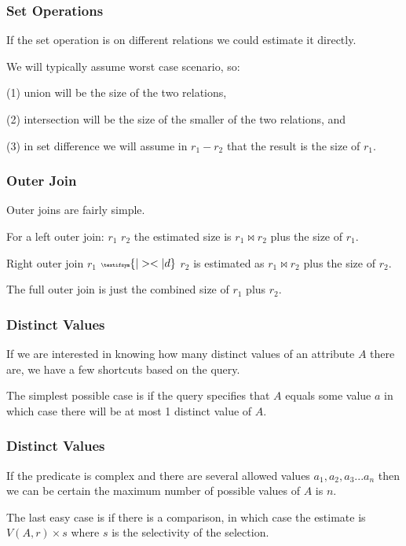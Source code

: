 \begin{frame}
\frametitle{Set Operations}

If the set operation is on different relations we could estimate it directly. 

We will typically assume worst case scenario, so: 

(1) union will be the size of the two relations, 

(2) intersection will be the size of the smaller of the two relations, and 

(3) in set difference we will assume in $r_{1} - r_{2}$ that the result is the size of $r_{1}$.

\end{frame}


\begin{frame}
\frametitle{Outer Join}

Outer joins are fairly simple. 

For a left outer join: $r_{1}$ {\tiny {}} $r_{2}$ the estimated size is $r_{1} \bowtie r_{2}$ plus the size of $r_{1}$.

Right outer join $r_{1}$ ${\tiny \textifsym{|><|d}}$ $r_{2}$ is estimated as $r_{1} \bowtie r_{2}$ plus the size of $r_{2}$. 

The full outer join {\tiny {}} is just the combined size of $r_{1}$ plus $r_{2}$.


\end{frame}

\begin{frame}
\frametitle{Distinct Values}

If we are interested in knowing how many distinct values of an attribute $A$ there are, we have a few shortcuts based on the query. 

The simplest possible case is if the query specifies that $A$ equals some value $a$ in which case there will be at most 1 distinct value of $A$. 

\end{frame}

\begin{frame}
\frametitle{Distinct Values}


If the predicate is complex and there are several allowed values $a_{1}, a_{2}, a_{3}... a_{n}$ then we can be certain the maximum number of possible values of $A$ is $n$. 

The last easy case is if there is a comparison, in which case the estimate is $V(A,r) \times s$ where $s$ is the selectivity of the selection.


\end{frame}


